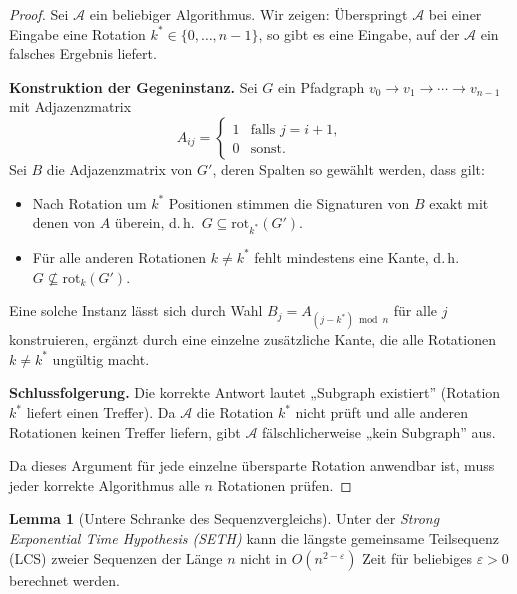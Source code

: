 \documentclass[a4paper,12pt]{article}
\theoremstyle{definition}
\newtheorem{lemma}{Lemma}
\begin{document}
\begin{proof}
Sei $\mathcal{A}$ ein beliebiger Algorithmus.
Wir zeigen: Überspringt $\mathcal{A}$ bei einer Eingabe eine Rotation $k^* \in \{0,\ldots,n-1\}$, so gibt es eine Eingabe, auf der $\mathcal{A}$ ein falsches Ergebnis liefert.

\textbf{Konstruktion der Gegeninstanz.}
Sei $G$ ein Pfadgraph $v_0 \to v_1 \to \cdots \to v_{n-1}$ mit Adjazenzmatrix
\[
	A_{ij} = \begin{cases} 1 & \text{falls } j = i+1, \\ 0 & \text{sonst.} \end{cases}
\]
Sei $B$ die Adjazenzmatrix von $G'$, deren Spalten so gewählt werden, dass gilt:
\begin{itemize}
	\item Nach Rotation um $k^*$ Positionen stimmen die Signaturen von $B$ exakt mit denen von $A$ überein, d.\,h.\ $G \subseteq \mathrm{rot}_{k^*}(G')$.
	\item Für alle anderen Rotationen $k \ne k^*$ fehlt mindestens eine Kante, d.\,h.\ $G \not\subseteq \mathrm{rot}_k(G')$.
\end{itemize}
Eine solche Instanz lässt sich durch Wahl $B_j = A_{(j - k^*) \bmod n}$ für alle $j$ konstruieren, ergänzt durch eine einzelne zusätzliche Kante, die alle Rotationen $k \ne k^*$ ungültig macht.

\textbf{Schlussfolgerung.}
Die korrekte Antwort lautet „Subgraph existiert'' (Rotation $k^*$ liefert einen Treffer).
Da $\mathcal{A}$ die Rotation $k^*$ nicht prüft und alle anderen Rotationen keinen Treffer liefern, gibt $\mathcal{A}$ fälschlicherweise „kein Subgraph'' aus.

Da dieses Argument für jede einzelne übersparte Rotation anwendbar ist, muss jeder korrekte Algorithmus alle $n$ Rotationen prüfen.
\end{proof}

\begin{lemma}[Untere Schranke des Sequenzvergleichs]
\label{lem:lcs}
Unter der \emph{Strong Exponential Time Hypothesis (SETH)} kann die längste gemeinsame Teil\-sequenz (LCS) zweier Sequenzen der Länge $n$ nicht in $O(n^{2-\varepsilon})$ Zeit für beliebiges $\varepsilon > 0$ berechnet werden.
\end{lemma}
\end{document}
